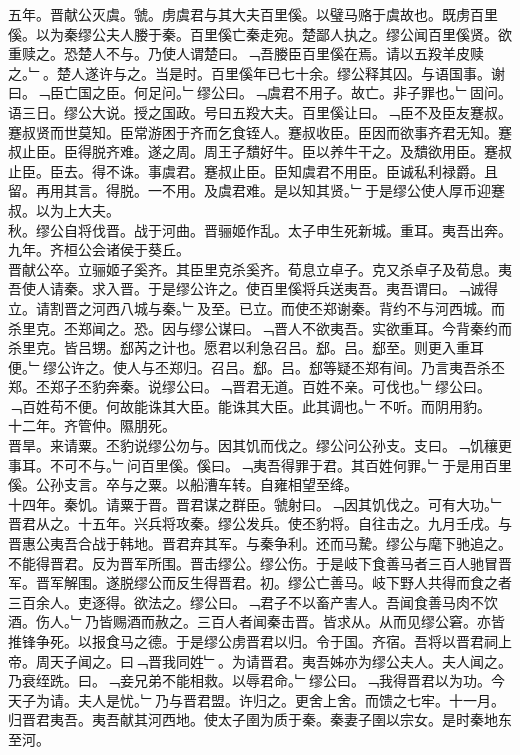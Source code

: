 \documentclass{zhvt-classic}
\begin{document}
\hspace*{2em}五年。晋献公灭虞。虢。虏虞君与其大夫百里傒。以璧马赂于虞故也。既虏百里傒。以为秦缪公夫人媵于秦。百里傒亡秦走宛。楚鄙人执之。缪公闻百里傒贤。欲重赎之。恐楚人不与。乃使人谓楚曰。﹁吾媵臣百里傒在焉。请以五羖羊皮赎之。﹂。楚人遂许与之。当是时。百里傒年已七十余。缪公释其囚。与语国事。谢曰。﹁臣亡国之臣。何足问。﹂缪公曰。﹁虞君不用子。故亡。非子罪也。﹂固问。语三日。缪公大说。授之国政。号曰五羖大夫。百里傒让曰。﹁臣不及臣友蹇叔。蹇叔贤而世莫知。臣常游困于齐而乞食铚人。蹇叔收臣。臣因而欲事齐君无知。蹇叔止臣。臣得脱齐难。遂之周。周王子穨好牛。臣以养牛干之。及穨欲用臣。蹇叔止臣。臣去。得不诛。事虞君。蹇叔止臣。臣知虞君不用臣。臣诚私利禄爵。且留。再用其言。得脱。一不用。及虞君难。是以知其贤。﹂于是缪公使人厚币迎蹇叔。以为上大夫。\\
\hspace*{2em}秋。缪公自将伐晋。战于河曲。晋骊姬作乱。太子申生死新城。重耳。夷吾出奔。\\
\hspace*{2em}九年。齐桓公会诸侯于葵丘。\\
\hspace*{2em}晋献公卒。立骊姬子奚齐。其臣里克杀奚齐。荀息立卓子。克又杀卓子及荀息。夷吾使人请秦。求入晋。于是缪公许之。使百里傒将兵送夷吾。夷吾谓曰。﹁诚得立。请割晋之河西八城与秦。﹂及至。已立。而使丕郑谢秦。背约不与河西城。而杀里克。丕郑闻之。恐。因与缪公谋曰。﹁晋人不欲夷吾。实欲重耳。今背秦约而杀里克。皆吕甥。郄芮之计也。愿君以利急召吕。郄。吕。郄至。则更入重耳便。﹂缪公许之。使人与丕郑归。召吕。郄。吕。郄等疑丕郑有间。乃言夷吾杀丕郑。丕郑子丕豹奔秦。说缪公曰。﹁晋君无道。百姓不亲。可伐也。﹂缪公曰。﹁百姓苟不便。何故能诛其大臣。能诛其大臣。此其调也。﹂不听。而阴用豹。\\
\hspace*{2em}十二年。齐管仲。隰朋死。\\
\hspace*{2em}晋旱。来请粟。丕豹说缪公勿与。因其饥而伐之。缪公问公孙支。支曰。﹁饥穰更事耳。不可不与。﹂问百里傒。傒曰。﹁夷吾得罪于君。其百姓何罪。﹂于是用百里傒。公孙支言。卒与之粟。以船漕车转。自雍相望至绛。\\
\hspace*{2em}十四年。秦饥。请粟于晋。晋君谋之群臣。虢射曰。﹁因其饥伐之。可有大功。﹂晋君从之。十五年。兴兵将攻秦。缪公发兵。使丕豹将。自往击之。九月壬戌。与晋惠公夷吾合战于韩地。晋君弃其军。与秦争利。还而马騺。缪公与麾下驰追之。不能得晋君。反为晋军所围。晋击缪公。缪公伤。于是岐下食善马者三百人驰冒晋军。晋军解围。遂脱缪公而反生得晋君。初。缪公亡善马。岐下野人共得而食之者三百余人。吏逐得。欲法之。缪公曰。﹁君子不以畜产害人。吾闻食善马肉不饮酒。伤人。﹂乃皆赐酒而赦之。三百人者闻秦击晋。皆求从。从而见缪公窘。亦皆推锋争死。以报食马之德。于是缪公虏晋君以归。令于国。齐宿。吾将以晋君祠上帝。周天子闻之。曰﹁晋我同姓﹂。为请晋君。夷吾姊亦为缪公夫人。夫人闻之。乃衰绖跣。曰。﹁妾兄弟不能相救。以辱君命。﹂缪公曰。﹁我得晋君以为功。今天子为请。夫人是忧。﹂乃与晋君盟。许归之。更舍上舍。而馈之七牢。十一月。归晋君夷吾。夷吾献其河西地。使太子圉为质于秦。秦妻子圉以宗女。是时秦地东至河。\\
\end{document}
